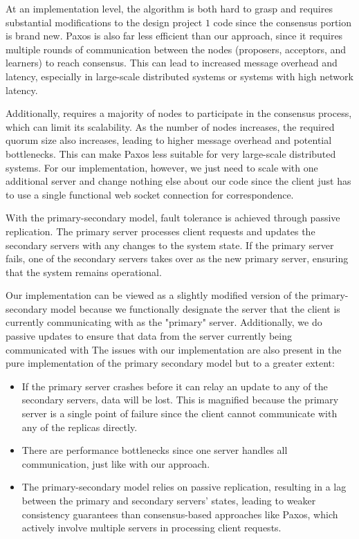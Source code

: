 \documentclass[
	a4paper, %
	10pt, %
	unnumberedsections, %
	twoside, %
]{LTJournalArticle}
\begin{document}
At an implementation level, the algorithm is both hard to grasp and requires substantial modifications to the design project $1$ code since the consensus portion is brand new. Paxos is also far less efficient than our approach, since it requires multiple rounds of communication between the nodes (proposers, acceptors, and learners) to reach consensus. This can lead to increased message overhead and latency, especially in large-scale distributed systems or systems with high network latency. 

Additionally, requires a majority of nodes to participate in the consensus process, which can limit its scalability. As the number of nodes increases, the required quorum size also increases, leading to higher message overhead and potential bottlenecks. This can make Paxos less suitable for very large-scale distributed systems. For our implementation, however, we just need to scale with one additional server and change nothing else about our code since the client just has to use a single functional web socket connection for correspondence. 

With the primary-secondary model, fault tolerance is achieved through passive replication. The primary server processes client requests and updates the secondary servers with any changes to the system state. If the primary server fails, one of the secondary servers takes over as the new primary server, ensuring that the system remains operational.

Our implementation can be viewed as a slightly modified version of the primary-secondary model because we functionally designate the server that the client is currently communicating with as the "primary" server. Additionally, we do passive updates to ensure that data from the server currently being communicated with  The issues with our implementation are also present in the pure implementation of the primary secondary model but to a greater extent: 
\begin{itemize}
    \item If the primary server crashes before it can relay an update to any of the secondary servers, data will be lost. This is magnified because the primary server is a single point of failure since the client cannot communicate with any of the replicas directly. 
    \item There are performance bottlenecks since one server handles all communication, just like with our approach. 
    \item The primary-secondary model relies on passive replication, resulting in a lag between the primary and secondary servers' states, leading to weaker consistency guarantees than consensus-based approaches like Paxos, which actively involve multiple servers in processing client requests.
\end{itemize}
\end{document}
